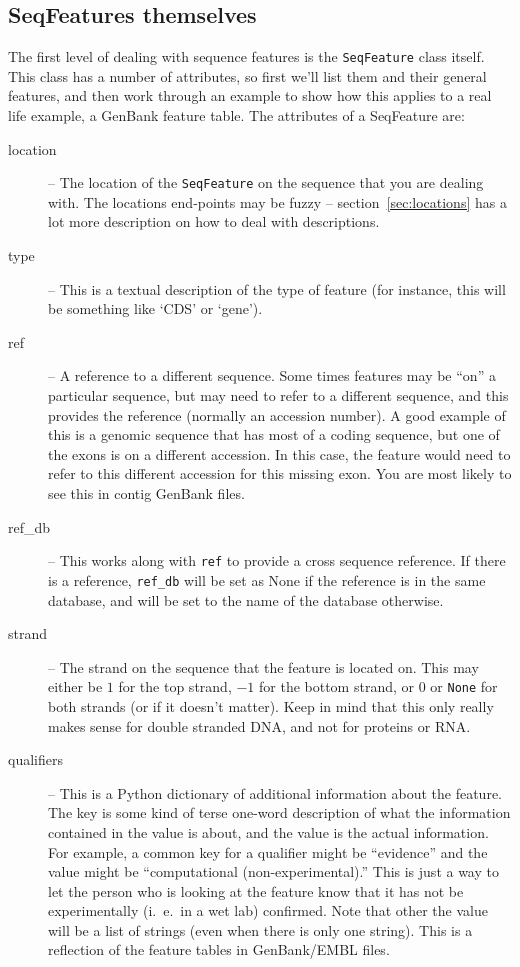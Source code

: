 \documentclass{report}
\begin{document}
\subsection{SeqFeatures themselves}

The first level of dealing with sequence features is the \verb|SeqFeature| class itself. This class has a number of attributes, so first we'll list them and their general features, and then work through an example to show how this applies to a real life example, a GenBank feature table. The attributes of a SeqFeature are:

\begin{description}
  \item[location] -- The location of the \verb|SeqFeature| on the sequence that you are dealing with. The locations end-points may be fuzzy -- section~\ref{sec:locations} has a lot more description on how to deal with descriptions.

  \item[type] -- This is a textual description of the type of feature (for instance, this will be something like `CDS' or `gene').

  \item[ref] -- A reference to a different sequence. Some times features may be ``on'' a particular sequence, but may need to refer to a different sequence, and this provides the reference (normally an accession number). A good example of this is a genomic sequence that has most of a coding sequence, but one of the exons is on a different accession. In this case, the feature would need to refer to this different accession for this missing exon. You are most likely to see this in contig GenBank files.

  \item[ref\_db] -- This works along with \verb|ref| to provide a cross sequence reference. If there is a reference, \verb|ref_db| will be set as None if the reference is in the same database, and will be set to the name of the database otherwise.

  \item[strand] -- The strand on the sequence that the feature is located on. This may either be $1$ for the top strand, $-1$ for the bottom strand, or $0$ or \texttt{None} for both strands (or if it doesn't matter). Keep in mind that this only really makes sense for double stranded DNA, and not for proteins or RNA.

  \item[qualifiers] -- This is a Python dictionary of additional information about the feature. The key is some kind of terse one-word description of what the information contained in the value is about, and the value is the actual information. For example, a common key for a qualifier might be ``evidence'' and the value might be ``computational (non-experimental).'' This is just a way to let the person who is looking at the feature know that it has not be experimentally (i.~e.~in a wet lab) confirmed. Note that other the value will be a list of strings (even when there is only one string). This is a reflection of the feature tables in GenBank/EMBL files.
 

\end{description}
\end{document}
